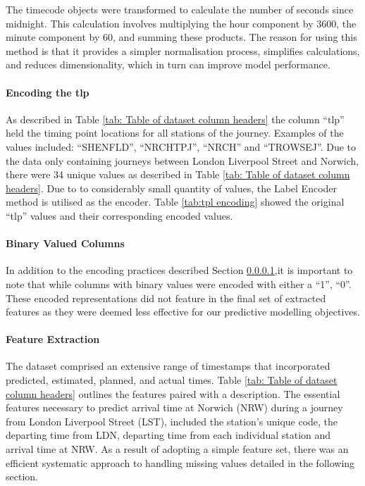 \noindent
The timecode objects were transformed to calculate the number of seconds since midnight. This calculation involves multiplying the hour component by 3600, the minute component by 60, and summing these products. The reason for using this method is that it provides a simpler normalisation process, simplifies calculations, and reduces dimensionality, which in turn can improve model performance. 

\paragraph{Encoding the tlp}\label{sec: Encoding the tlp}
As described in Table \ref{tab: Table of dataset column headers} the column ``tlp'' held the timing point locations for all stations of the journey. Examples of the values included: ``SHENFLD'', ``NRCHTPJ'', ``NRCH'' and ``TROWSEJ''. Due to the data only containing journeys between London Liverpool Street and Norwich, there were 34 unique values as described in Table \ref{tab: Table of dataset column headers}. Due to to considerably small quantity of values, the Label Encoder method is utilised as the encoder. Table \ref{tab:tpl encoding} showed the original ``tlp'' values and their corresponding encoded values.

\paragraph{Binary Valued Columns}
In addition to the encoding practices described Section \ref{sec: Encoding the tlp},it is important to note that while columns with binary values were encoded with either a ``1'', ``0''. These encoded representations did not feature in the final set of extracted features as they were deemed less effective for our predictive modelling objectives.

\paragraph{Feature Extraction}
The dataset comprised an extensive range of timestamps that incorporated predicted, estimated, planned, and actual times. Table \ref{tab: Table of dataset column headers} outlines the features paired with a description. The essential features necessary to predict arrival time at Norwich (NRW) during a journey from London Liverpool Street (LST), included the station's unique code, the departing time from LDN, departing time from each individual station and arrival time at NRW. As a result of adopting a simple feature set, there was an efficient systematic approach to handling missing values detailed in the following section.

